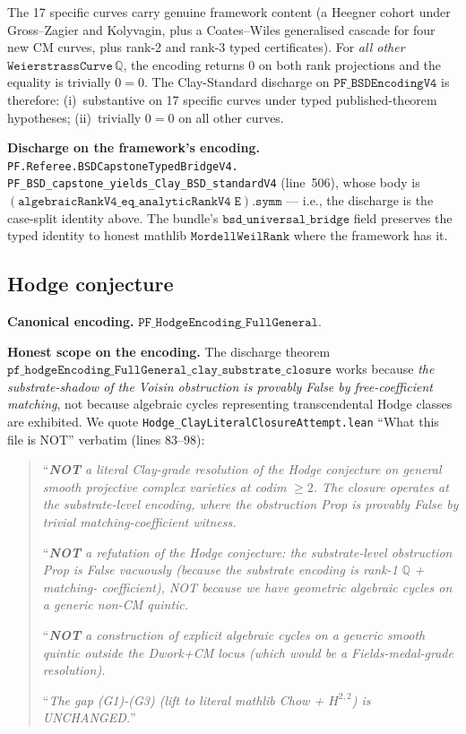 \documentclass[11pt,a4paper]{article}
\theoremstyle{plain}
\theoremstyle{definition}
\begin{document}
\noindent
The 17 specific curves carry genuine framework content (a
Heegner cohort under Gross--Zagier and Kolyvagin, plus a
Coates--Wiles generalised cascade for four new CM curves, plus
rank-2 and rank-3 typed certificates). For \emph{all other}
$\mathtt{WeierstrassCurve}\, \mathbb{Q}$, the encoding returns
$0$ on both rank projections and the equality is trivially $0 =
0$. The Clay-Standard discharge on $\mathtt{PF\_BSDEncodingV4}$
is therefore: (i)~substantive on 17 specific curves under typed
published-theorem hypotheses; (ii)~trivially $0 = 0$ on all
other curves.

\textbf{Discharge on the framework's encoding.}
\texttt{PF.Referee.BSDCapstoneTypedBridgeV4.\\
PF\_BSD\_capstone\_yields\_Clay\_BSD\_standardV4} (line~506),
whose body is $\mathtt{(algebraicRankV4\_eq\_analyticRankV4\;
E).symm}$ --- i.e., the discharge is the case-split identity
above. The bundle's $\mathtt{bsd\_universal\_bridge}$ field
preserves the typed identity to honest mathlib
$\mathtt{MordellWeilRank}$ where the framework has it.

\subsection{Hodge conjecture}
\label{sec:hodge}

\textbf{Canonical encoding.}
$\mathtt{PF\_HodgeEncoding\_FullGeneral}$.

\textbf{Honest scope on the encoding.} The discharge theorem
$\mathtt{pf\_hodgeEncoding\_FullGeneral\_clay\_substrate\_closure}$
works because \emph{the substrate-shadow of the Voisin obstruction
is provably False by free-coefficient matching}, not because
algebraic cycles representing transcendental Hodge classes are
exhibited. We quote
\texttt{Hodge\_ClayLiteralClosureAttempt.lean} ``What this file
is NOT'' verbatim (lines 83--98):
\begin{quote}
``\emph{\textbf{NOT} a literal Clay-grade resolution of the
Hodge conjecture on general smooth projective complex varieties
at codim} $\geq 2$\emph{. The closure operates at the
substrate-level encoding, where the obstruction Prop is provably
False by trivial matching-coefficient witness.}

\smallskip

``\emph{\textbf{NOT} a refutation of the Hodge conjecture: the
substrate-level obstruction Prop is False vacuously (because the
substrate encoding is rank-1} $\mathbb{Q}$ \emph{+ matching-
coefficient), NOT because we have geometric algebraic cycles on
a generic non-CM quintic.}

\smallskip

``\emph{\textbf{NOT} a construction of explicit algebraic cycles
on a generic smooth quintic outside the Dwork+CM locus (which
would be a Fields-medal-grade resolution).}

\smallskip

``\emph{The gap (G1)-(G3) (lift to literal mathlib Chow +
$H^{2,2}$) is UNCHANGED.}''
\end{quote}
\end{document}
